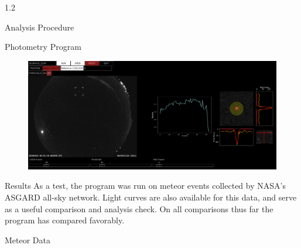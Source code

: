 \documentclass[final]{beamer}
\newlength{\twocolwid}
\begin{document}
\begin{frame}[t]
\begin{columns}[t]
\begin{column}{1.2\twocolwid}
\begin{alertblock}{Analysis Procedure}
\begin{figure}
\begin{subfigure}{.5\textwidth}
  \label{fig:gaussians}
\end{subfigure}
\end{figure}
\vspace{-1.25cm}
\end{alertblock}


\begin{alertblock}{Photometry Program}
\begin{figure}
	\centering
	\includegraphics[width=\linewidth]{ProgramLandscape.png}
	\label{fig:}
\end{figure}
\vspace{-1.5cm}
\end{alertblock}





\begin{block}{Results}
As a test, the program was run on meteor events collected by NASA's ASGARD all-sky network. Light curves are also available for this data, and serve as a useful comparison and analysis check. On all comparisons thus far the program has compared favorably. 
\end{block}

\begin{alertblock}{Meteor Data}


\end{alertblock}
\end{column}
\end{columns}
\end{frame}
\end{document}
